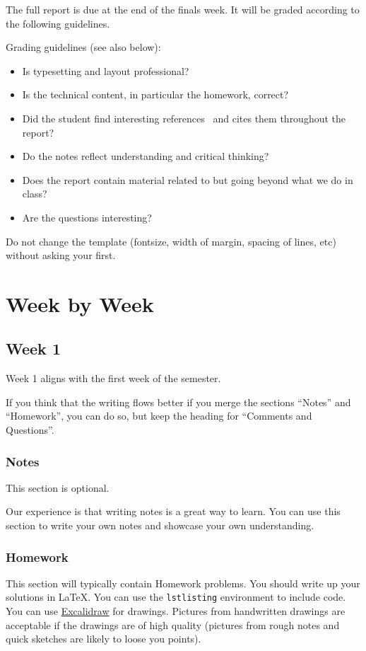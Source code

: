 \documentclass{article}
\theoremstyle{theorem}
\theoremstyle{definition}
\theoremstyle{remark}
\begin{document}
The full report is due at the end of the finals week. It will be graded according to the following guidelines.

Grading  guidelines (see also below):
\begin{itemize}
\item Is typesetting and layout professional? 
\item Is the technical content, in particular the homework, correct?
\item Did the student find interesting references~\cite{bla} and cites them throughout the report?
\item Do the notes reflect understanding and critical thinking?
\item Does the report contain material related to but going beyond what we do in class?
\item Are the questions interesting?
\end{itemize}

Do not change the template (fontsize, width of margin, spacing of lines, etc) without asking your first.

\section{Week by Week}\label{homework}

\subsection{Week 1}

Week 1 aligns with the first week of the semester. 

If you think that the writing flows better if you merge the sections ``Notes'' and ``Homework'', you can do so, but keep the heading for ``Comments and Questions''.

\subsubsection{Notes}

This section is optional. 

Our experience is that writing notes is a great way to learn. You can use this section to write your own notes and showcase your own understanding. 

\subsubsection{Homework}

This section will typically contain Homework problems. You should write up your solutions in \LaTeX{}. You can use the \texttt{lstlisting} environment to include code. You can use \href{https://excalidraw.com/}{Excalidraw} for drawings. Pictures from handwritten drawings are acceptable if the drawings are of high quality (pictures from rough notes and quick sketches are likely to loose you points). 
\end{document}
